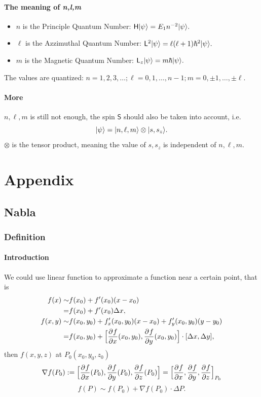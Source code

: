 \documentclass{article}
\newcommand*{\op}[1]{\mathsf{#1}}
\begin{document}
\paragraph{The meaning of \textit{n,l,m}}
\begin{itemize}
	\item $n$ is the Principle Quantum Number: $\op{H}\ket\psi=E_1n^{-2}\ket\psi.$
	\item $\ell$ is the Azzimuthal Quantum Number: $\op{L}^2\ket\psi=\ell(\ell+1)\hbar^2\ket\psi.$
	\item $m$ is the Magnetic Quantum Number: $\op{L}_z\ket\psi=m\hbar\ket\psi.$
\end{itemize}
The values are quantized: $n=1,2,3,\ldots;\ell=0,1,\ldots,n-1;m=0,\pm 1,\ldots,\pm\ell$.
\paragraph{More} $n,\ell,m$ is still not enough, the spin $\op{S}$ should also be taken into account, i.e.
$$\lvert\psi\rangle=\lvert n,\ell,m\rangle\otimes\lvert s,s_z\rangle.$$
$\otimes$ is the tensor product, meaning the value of $s,s_z$ is independent of $n,\ell,m$.
\section{Appendix}
\subsection{Nabla}
\subsubsection{Definition}
\paragraph{Introduction}We could use linear function to approximate a function near a certain point, that is
\begin{align*}
	f(x)\sim   & f(x_0)+f'(x_0)(x-x_0)                                                                \\
	=          & f(x_0)+f'(x_0)\Delta x,                                                              \\
	f(x,y)\sim & f(x_0,y_0)+f'_x(x_0,y_0)(x-x_0)+f'_y(x_0,y_0)(y-y_0)                                 \\
	=          & f(x_0,y_0)+\Bigl[\frac{\partial^{}f}{\partial{x}^{}}(x_0,y_0),\frac{\partial^{}f}{\partial{y}^{}}(x_0,y_0)\Bigr]\cdot[\Delta x,\Delta y],
\end{align*}
then $f(x,y,z)$ at $P_0(x_0,y_0,z_0)$
$$\nabla f(P_0):=\Bigl[\frac{\partial^{}f}{\partial{x}^{}}(P_0),\frac{\partial^{}f}{\partial{y}^{}}(P_0),\frac{\partial^{}f}{\partial{z}^{}}(P_0)\Bigr]=\Bigl[\frac{\partial^{}f}{\partial{x}^{}},\frac{\partial^{}f}{\partial{y}^{}},\frac{\partial^{}f}{\partial{z}^{}}\Bigr]_{P_0}$$
$$f(P)\sim f(P_0)+\nabla f(P_0)\cdot\Delta P.$$
\end{document}
